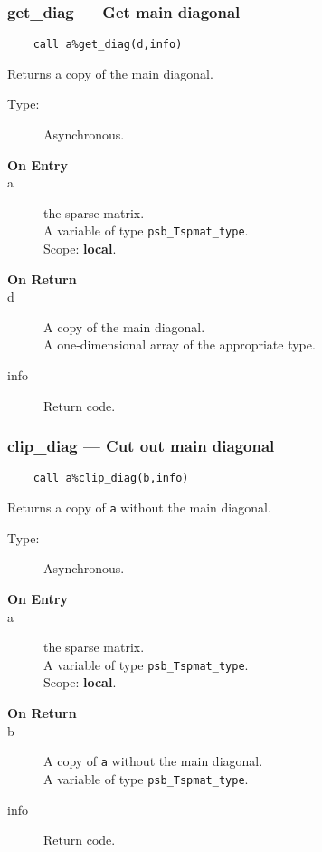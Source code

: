 \subsubsection{get\_diag --- Get main diagonal}
\begin{verbatim}
    call a%get_diag(d,info)
\end{verbatim}

Returns a copy of  the main diagonal.
\begin{description}
\item[Type:] Asynchronous.
\item[\bf On Entry]
\item[a] the sparse matrix.\\
A variable of type \verb|psb_Tspmat_type|.\\
Scope: {\bf local}.\\
\end{description}
\begin{description}
\item[\bf On Return]
\item[d] A copy  of the main diagonal.\\
A one-dimensional array of the appropriate type.
\item[info] Return code. 
\end{description}


\subsubsection{clip\_diag --- Cut out main diagonal}
\begin{verbatim}
    call a%clip_diag(b,info)
\end{verbatim}

Returns a copy of \verb|a| without the main diagonal.
\begin{description}
\item[Type:] Asynchronous.
\item[\bf On Entry]
\item[a] the sparse matrix.\\
A variable of type \verb|psb_Tspmat_type|.\\
Scope: {\bf local}.\\
\end{description}
\begin{description}
\item[\bf On Return]
\item[b] A copy  of  \verb|a| without the main diagonal.\\
A variable of type \verb|psb_Tspmat_type|.
\item[info] Return code. 
\end{description}


